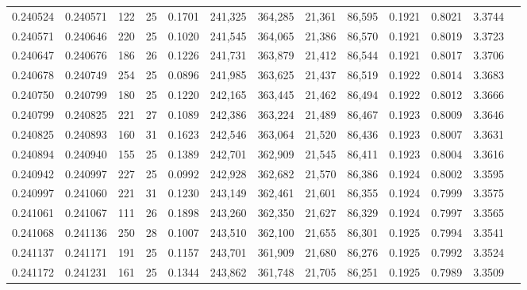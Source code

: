 \begin{tabular}{rrrrrrrrrrrrr}
0.240524 & 0.240571 &   122 &  25 &                                     0.1701 & 241,325 & 364,285 &  21,361 &  86,595 & 0.1921 & 0.8021 & 3.3744 \\
0.240571 & 0.240646 &   220 &  25 &                                     0.1020 & 241,545 & 364,065 &  21,386 &  86,570 & 0.1921 & 0.8019 & 3.3723 \\
0.240647 & 0.240676 &   186 &  26 &                                     0.1226 & 241,731 & 363,879 &  21,412 &  86,544 & 0.1921 & 0.8017 & 3.3706 \\
0.240678 & 0.240749 &   254 &  25 &                                     0.0896 & 241,985 & 363,625 &  21,437 &  86,519 & 0.1922 & 0.8014 & 3.3683 \\
0.240750 & 0.240799 &   180 &  25 &                                     0.1220 & 242,165 & 363,445 &  21,462 &  86,494 & 0.1922 & 0.8012 & 3.3666 \\
0.240799 & 0.240825 &   221 &  27 &                                     0.1089 & 242,386 & 363,224 &  21,489 &  86,467 & 0.1923 & 0.8009 & 3.3646 \\
0.240825 & 0.240893 &   160 &  31 &                                     0.1623 & 242,546 & 363,064 &  21,520 &  86,436 & 0.1923 & 0.8007 & 3.3631 \\
0.240894 & 0.240940 &   155 &  25 &                                     0.1389 & 242,701 & 362,909 &  21,545 &  86,411 & 0.1923 & 0.8004 & 3.3616 \\
0.240942 & 0.240997 &   227 &  25 &                                     0.0992 & 242,928 & 362,682 &  21,570 &  86,386 & 0.1924 & 0.8002 & 3.3595 \\
0.240997 & 0.241060 &   221 &  31 &                                     0.1230 & 243,149 & 362,461 &  21,601 &  86,355 & 0.1924 & 0.7999 & 3.3575 \\
0.241061 & 0.241067 &   111 &  26 &                                     0.1898 & 243,260 & 362,350 &  21,627 &  86,329 & 0.1924 & 0.7997 & 3.3565 \\
0.241068 & 0.241136 &   250 &  28 &                                     0.1007 & 243,510 & 362,100 &  21,655 &  86,301 & 0.1925 & 0.7994 & 3.3541 \\
0.241137 & 0.241171 &   191 &  25 &                                     0.1157 & 243,701 & 361,909 &  21,680 &  86,276 & 0.1925 & 0.7992 & 3.3524 \\
0.241172 & 0.241231 &   161 &  25 &                                     0.1344 & 243,862 & 361,748 &  21,705 &  86,251 & 0.1925 & 0.7989 & 3.3509 \\

\end{tabular}
